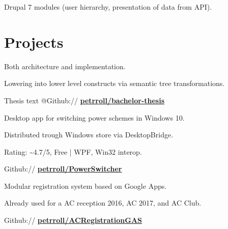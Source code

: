 \documentclass[a4paper]{deedy-resume} %
\begin{document}
\begin{minipage}[t]{0.66\textwidth}
\begin{tightitemize}
\item Drupal 7 modules (user hierarchy, presentation of data from API).
\end{tightitemize}

\sectionspace %



\section{Projects}

\begin{tightitemize}
\item Both architecture and implementation.
\item Lowering into lower level constructs via semantic tree transformations.
\item Thesis text @Github:// \href{https://github.com/petrroll/bachelor-thesis}{\bf petrroll/bachelor-thesis}
\end{tightitemize}
\sectionspace %


\emptyLocation %
\begin{tightitemize}
\item Desktop app for switching power schemes in Windows 10.
\item Distributed trough Windows store via DesktopBridge.
\item Rating: \textasciitilde4.7/5, Free | WPF, Win32 interop.
\item Github:// \href{https://github.com/petrroll/PowerSwitcher}{\bf petrroll/PowerSwitcher}
\end{tightitemize}

\sectionspace %


\emptyLocation %
\begin{tightitemize}
\item Modular registration system based on Google Apps.
\item Already used for a AC reception 2016, AC 2017, and AC Club.
\item Github:// \href{https://github.com/petrroll/ACRegistrationGAS}{\bf petrroll/ACRegistrationGAS}
\end{tightitemize}


\end{minipage}
\end{document}

